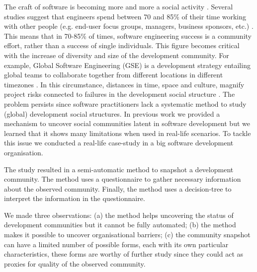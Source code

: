 \documentclass[conference]{IEEEtran}
\begin{document}
The craft of software is becoming more and more a social activity \cite{specissue}. Several studies suggest that engineers spend between 70 and 85\% of their time working with other people (e.g. end-user focus groups, managers, business sponsors, etc.) \cite{socialbook}. This means that in 70-85\% of times, software engineering success is a community effort, rather than a success of single individuals. This figure becomes critical with the increase of diversity and size of the development community. For example, Global Software Engineering (GSE) is a development strategy entailing global teams to collaborate together from different locations in different timezones \cite{gsdbook}. In this circumstance, distances in time, space and culture, magnify project risks connected to failures in the development social structure \cite{empirglob,nachiappan,icgseoss}.
The problem persists since software practitioners lack a systematic method to study (global) development social structures. In previous work \cite{specissue} we provided a mechanism to uncover social communities latent in software development but we learned that it shows many limitations when used in real-life scenarios.
To tackle this issue we conducted a real-life case-study in a big software development organisation. 

The study resulted in a semi-automatic method to snapshot a development community. The method uses a questionnaire to gather necessary information about the observed community. Finally, the method uses a decision-tree \cite{specissue} to interpret the information in the questionnaire. 
 
We made three observations: (a) the method helps uncovering the status of development communities but it cannot be fully automated; (b) the method makes it possible to uncover organisational barriers; (c) the community snapshot can have a limited number of possible forms, each with its own particular characteristics, these forms are worthy of further study since they could act as proxies for quality of the observed community.

\end{document}
